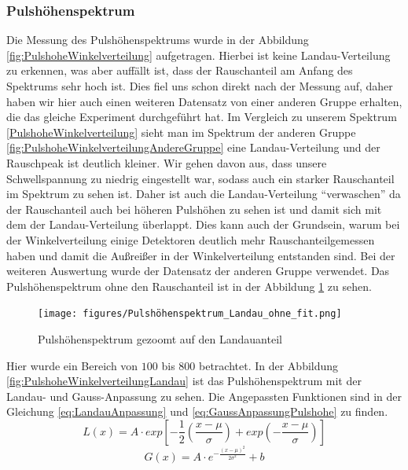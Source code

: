 \documentclass{article}
\begin{document}
\subsubsection*{Pulshöhenspektrum}
Die Messung des Pulshöhenspektrums wurde in der Abbildung \ref{fig:PulshoheWinkelverteilung} aufgetragen.
Hierbei ist keine Landau-Verteilung zu erkennen, was aber auffällt ist, dass der Rauschanteil am Anfang des Spektrums sehr hoch ist.
Dies fiel uns schon direkt nach der Messung auf, daher haben wir hier auch einen weiteren Datensatz von einer anderen Gruppe erhalten, die das gleiche Experiment durchgeführt hat.
Im Vergleich zu unserem Spektrum \ref{PulshoheWinkelverteilung} sieht man im Spektrum der anderen Gruppe \ref{fig:PulshoheWinkelverteilungAndereGruppe} eine Landau-Verteilung und der Rauschpeak
ist deutlich kleiner.
Wir gehen davon aus, dass unsere Schwellspannung zu niedrig eingestellt war, sodass auch ein starker Rauschanteil im Spektrum zu sehen ist. Daher ist auch die Landau-Verteilung \enquote{verwaschen} da der Rauschanteil auch
bei höheren Pulshöhen zu sehen ist und damit sich mit dem der Landau-Verteilung überlappt.
Dies kann auch der Grundsein, warum bei der Winkelverteilung einige Detektoren deutlich mehr Rauschanteilgemessen haben und damit die Außreißer in der Winkelverteilung entstanden sind.
Bei der weiteren Auswertung wurde der Datensatz der anderen Gruppe verwendet.
Das Pulshöhenspektrum ohne den Rauschanteil ist in der Abbildung \ref{fig:PulshoheWinkelverteilungLandauOhneFit} zu sehen.
\begin{figure}
    \centering
    \texttt{[image: figures/Pulshöhenspektrum\_Landau\_ohne\_fit.png]}
    \caption{Pulshöhenspektrum gezoomt auf den Landauanteil}
    \label{fig:PulshoheWinkelverteilungLandauOhneFit}
\end{figure}
Hier wurde ein Bereich von $100$ bis $800$ betrachtet.
In der Abbildung \ref{fig:PulshoheWinkelverteilungLandau} ist das Pulshöhenspektrum mit der Landau- und Gauss-Anpassung zu sehen.
Die Angepassten Funktionen sind in der Gleichung \ref{eq:LandauAnpassung} und \ref{eq:GaussAnpassungPulshohe} zu finden.
\begin{displaymath}
    L(x) = A \cdot exp\left[ -\frac{1}{2} \left( \frac{x - \mu}{\sigma} \right) + exp\left( -\frac{x - \mu }{\sigma} \right) \right] 
\label{eq:LandauAnpassung}
\end{displaymath}
\begin{displaymath}
    G(x) = A \cdot e^{-\frac{(x - \mu)^2}{2\sigma^2}} + b
\label{eq:GaussAnpassungPulshohe}
\end{displaymath}
\end{document}
